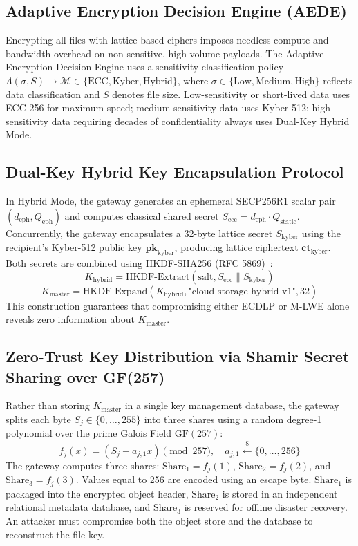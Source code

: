 \documentclass[sn-mathphys,Numbered]{sn-jnl}%
\theoremstyle{thmstyleone}%
\theoremstyle{thmstyletwo}%
\theoremstyle{thmstylethree}%
\begin{document}
\subsection{\textbf{Adaptive Encryption Decision Engine (AEDE)}}
Encrypting all files with lattice-based ciphers imposes needless compute and bandwidth overhead on non-sensitive, high-volume payloads. The Adaptive Encryption Decision Engine uses a sensitivity classification policy $\Lambda(\sigma, S) \to \mathcal{M} \in \{\text{ECC}, \text{Kyber}, \text{Hybrid}\}$, where $\sigma \in \{\text{Low}, \text{Medium}, \text{High}\}$ reflects data classification and $S$ denotes file size. Low-sensitivity or short-lived data uses ECC-256 for maximum speed; medium-sensitivity data uses Kyber-512; high-sensitivity data requiring decades of confidentiality always uses Dual-Key Hybrid Mode.

\subsection{\textbf{Dual-Key Hybrid Key Encapsulation Protocol}}
In Hybrid Mode, the gateway generates an ephemeral SECP256R1 scalar pair $(d_{\text{eph}}, Q_{\text{eph}})$ and computes classical shared secret $S_{\text{ecc}} = d_{\text{eph}} \cdot Q_{\text{static}}$. Concurrently, the gateway encapsulates a 32-byte lattice secret $S_{\text{kyber}}$ using the recipient's Kyber-512 public key $\mathbf{pk}_{\text{kyber}}$, producing lattice ciphertext $\mathbf{ct}_{\text{kyber}}$. Both secrets are combined using HKDF-SHA256 (RFC 5869)~\cite{krawczyk2010hkdf}:
\begin{equation}
K_{\text{hybrid}} = \text{HKDF-Extract}(\text{salt}, S_{\text{ecc}} \parallel S_{\text{kyber}})
\end{equation}
\begin{equation}
K_{\text{master}} = \text{HKDF-Expand}(K_{\text{hybrid}}, \text{"cloud-storage-hybrid-v1"}, 32)
\end{equation}
This construction guarantees that compromising either ECDLP or M-LWE alone reveals zero information about $K_{\text{master}}$.

\subsection{\textbf{Zero-Trust Key Distribution via Shamir Secret Sharing over GF(257)}}
Rather than storing $K_{\text{master}}$ in a single key management database, the gateway splits each byte $S_j \in \{0, \dots, 255\}$ into three shares using a random degree-1 polynomial over the prime Galois Field $\text{GF}(257)$:
\begin{equation}
f_j(x) = (S_j + a_{j,1} x) \pmod{257}, \quad a_{j,1} \xleftarrow{\$} \{0, \dots, 256\}
\end{equation}
The gateway computes three shares: $\text{Share}_1 = f_j(1)$, $\text{Share}_2 = f_j(2)$, and $\text{Share}_3 = f_j(3)$. Values equal to 256 are encoded using an escape byte. $\text{Share}_1$ is packaged into the encrypted object header, $\text{Share}_2$ is stored in an independent relational metadata database, and $\text{Share}_3$ is reserved for offline disaster recovery. An attacker must compromise both the object store and the database to reconstruct the file key.
\end{document}
